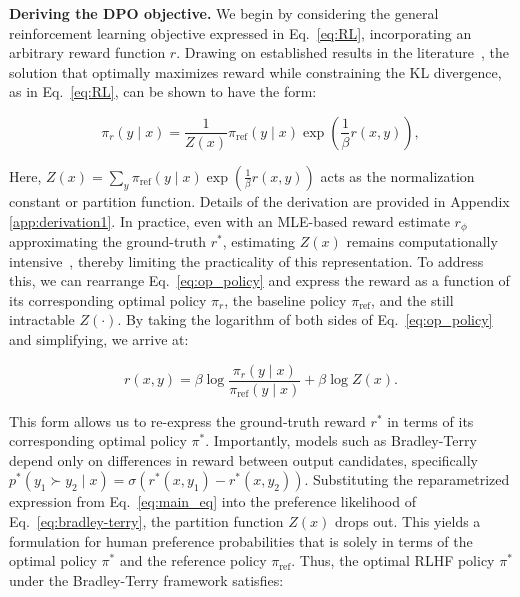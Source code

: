 \textbf{Deriving the DPO objective.} We begin by considering the general reinforcement learning objective expressed in Eq.~\ref{eq:RL}, incorporating an arbitrary reward function $r$. Drawing on established results in the literature~\citep{peters2007reinforcement, peng2019advantage, korbak2022reinforcement, go2023aligning}, the solution that optimally maximizes reward while constraining the KL divergence, as in Eq.~\ref{eq:RL}, can be shown to have the form:

\begin{equation}\label{eq:op_policy}
    \pi_r(y\mid x) = \frac{1}{Z(x)}\pi_\text{ref}(y\mid x)\exp\left(\frac{1}{\beta}r(x, y)\right),
\end{equation}

Here, $Z(x) =\sum_{y}\pi_\text{ref}(y\mid x)\exp\left(\frac{1}{\beta}r(x, y)\right)$ acts as the normalization constant or partition function. Details of the derivation are provided in Appendix \ref{app:derivation1}. In practice, even with an MLE-based reward estimate $r_{\phi}$ approximating the ground-truth $r^*$, estimating $Z(x)$ remains computationally intensive~\citep{korbak2022reinforcement, go2023aligning}, thereby limiting the practicality of this representation. To address this, we can rearrange Eq.~\ref{eq:op_policy} and express the reward as a function of its corresponding optimal policy $\pi_r$, the baseline policy $\pi_\text{ref}$, and the still intractable $Z(\cdot)$. By taking the logarithm of both sides of Eq.~\ref{eq:op_policy} and simplifying, we arrive at:

\begin{equation}\label{eq:main_eq}
    r(x,y) =\beta \log \frac{\pi_r(y\mid x)}{\pi_\text{ref}(y\mid x)} + \beta \log Z(x).
\end{equation}

This form allows us to re-express the ground-truth reward $r^*$ in terms of its corresponding optimal policy $\pi^*$. Importantly, models such as Bradley-Terry depend only on differences in reward between output candidates, specifically ${p^*(y_1 \succ y_2 \mid x) = \sigma(r^*(x, y_1) - r^*(x, y_2))}$. Substituting the reparametrized expression from Eq.~\ref{eq:main_eq} into the preference likelihood of Eq.~\ref{eq:bradley-terry}, the partition function $Z(x)$ drops out. This yields a formulation for human preference probabilities that is solely in terms of the optimal policy $\pi^*$ and the reference policy $\pi_\text{ref}$. Thus, the optimal RLHF policy $\pi^*$ under the Bradley-Terry framework satisfies:

